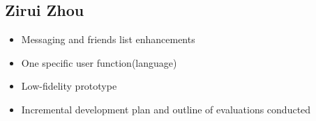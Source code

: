 \documentclass[12pt]{article}
\begin{document}
    \subsection*{Zirui Zhou}

    \begin{itemize}
        \item Messaging and friends list enhancements
        \item One specific user function(language)
        \item Low-fidelity prototype
        \item Incremental development plan and outline of evaluations conducted
    \end{itemize}


 
\end{document}
